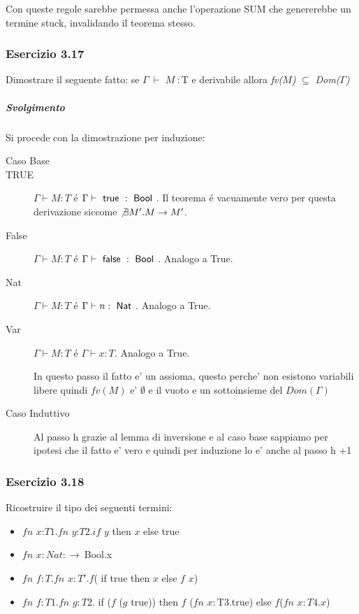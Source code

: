 Con queste regole sarebbe permessa anche l'operazione SUM che genererebbe un termine stuck, invalidando il teorema stesso.

\subsubsection*{Esercizio 3.17}

Dimostrare il seguente fatto: se $\Gamma\:\vdash$ $M\: :  $T e derivabile allora  \textit{fv($M$)}  $\subseteq$ \textit{Dom($\Gamma$)}
\subparagraph*{Svolgimento}

Si procede con la dimostrazione per induzione:

\begin{description}

\item[Caso Base]

\item[TRUE] $\Gamma \vdash{} M : T$ \'e $\Gamma \vdash{} \true{} :
  \Bool$.
  Il teorema \'e vacuamente vero per questa derivazione siccome
  $\not \exists{M'}. M \to{} M'$.
  
 \item[False]
  $\Gamma \vdash{} M : T$ \'e $\Gamma \vdash{} \false{} : \Bool$.
  Analogo a True.

\item[Nat]
  $\Gamma \vdash{} M : T$ \'e $\Gamma \vdash{} n : \Nat$. Analogo a True.

\item[Var] $\Gamma \vdash{} M : T$ \'e $\Gamma \vdash{} x : T$.
  Analogo a True.
  
 In questo passo il fatto e' un assioma, questo perche' non esistono variabili libere quindi $fv(M)$ e' $\emptyset$ e il vuoto e un sottoinsieme del $Dom(\Gamma)$

\item[Caso Induttivo]

Al passo h grazie al lemma di inversione e al caso base sappiamo per ipotesi che il fatto e' vero e quindi per induzione lo e' anche al passo h +1 

\end{description}

\subsubsection*{Esercizio 3.18}
Ricostruire il tipo dei seguenti termini:
\begin{itemize}
\item $fn$ $x$:$T1.fn$ $y$:$T2.if$ $y$ then $x$ else true
\item $fn$ $x:Nat:\rightarrow\:$Bool.x
\item $fn$ $f:T.fn$ $x:T'.f$( if true  then  $x$  else  $f$ $x$)
\item $fn$ $f:T1.fn$ $g:T2.$ if ($f$ ($g$ true)) then $f$ ($fn$ $x:$T3.true) else $f$($fn$ $x:T4.x$)
\end{itemize}


